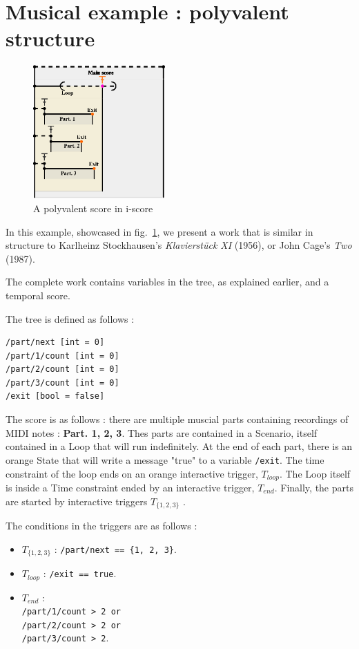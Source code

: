 \documentclass{article}
\begin{document}
\section{Musical example : polyvalent structure}
\begin{figure}
    \centering
    \includegraphics[width=0.45\textwidth]{images/partition.eps}
    \caption{A polyvalent score in i-score}
    \label{fig.polyvalent}
\end{figure}

In this example, showcased in fig.~\ref{fig.polyvalent}, we present a work that is similar in structure to Karlheinz Stockhausen's \emph{Klavierstück XI} (1956), or John Cage's \emph{Two} (1987). 

The complete work contains variables in the tree, as explained earlier, and a temporal score.

The tree is defined as follows : 
\begin{lstlisting}
/part/next [int = 0]
/part/1/count [int = 0]
/part/2/count [int = 0]
/part/3/count [int = 0]
/exit [bool = false]
\end{lstlisting}

The score is as follows : there are multiple muscial parts containing recordings of MIDI notes : \textbf{Part. 1, 2, 3}.
Thes parts are contained in a Scenario, itself contained in a Loop that will run indefinitely. 
At the end of each part, there is an orange State that will write a message "true" to a variable \verb|/exit|.
The time constraint of the loop ends on an orange interactive trigger, $T_{loop}$.
The Loop itself is inside a Time constraint ended by an interactive trigger, $T_{end}$.
Finally, the parts are started by interactive triggers  $T_{\{1, 2, 3\}}$ .

The conditions in the triggers are as follows : 
\begin{itemize}
\item  $T_{\{1, 2, 3\}}$ : \verb|/part/next == {1, 2, 3}|.
\item $T_{loop}$ : \verb|/exit == true|.
\item $T_{end}$ : ~\\
\verb|/part/1/count > 2 or| \\
\verb|/part/2/count > 2 or| \\
\verb|/part/3/count > 2|.
\end{itemize}
\end{document}
